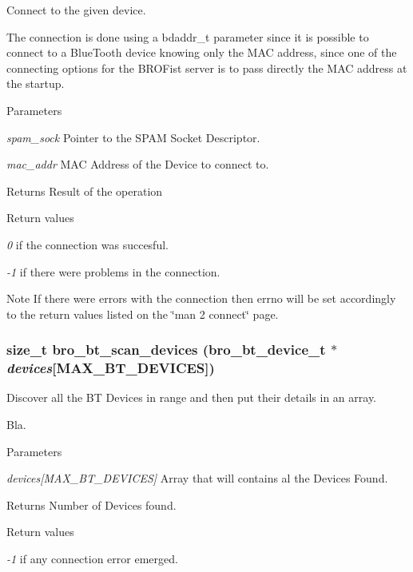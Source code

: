 Connect to the given device. 

The connection is done using a {\ttfamily bdaddr\_\-t} parameter since it is possible to connect to a BlueTooth device knowing only the MAC address, since one of the connecting options for the BROFist server is to pass directly the MAC address at the startup.


\begin{DoxyParams}{Parameters}
\item[{\em spam\_\-sock}]Pointer to the SPAM Socket Descriptor. \item[{\em mac\_\-addr}]MAC Address of the Device to connect to. \end{DoxyParams}
\begin{DoxyReturn}{Returns}
Result of the operation 
\end{DoxyReturn}

\begin{DoxyRetVals}{Return values}
\item[{\em 0}]if the connection was succesful. \item[{\em -\/1}]if there were problems in the connection. \end{DoxyRetVals}
\begin{DoxyNote}{Note}
If there were errors with the connection then {\ttfamily errno} will be set accordingly to the return values listed on the {\ttfamily \char`\"{}man 2
        connect\char`\"{}} page. 
\end{DoxyNote}
\hypertarget{group___bro_b_t_ga4d15ac149696de8a2e530da1840cd8c3}{
\subsubsection[{bro\_\-bt\_\-scan\_\-devices}]{\setlength{\rightskip}{0pt plus 5cm}size\_\-t bro\_\-bt\_\-scan\_\-devices ({\bf bro\_\-bt\_\-device\_\-t} $\ast$ {\em devices}\mbox{[}MAX\_\-BT\_\-DEVICES\mbox{]})}}
\label{group___bro_b_t_ga4d15ac149696de8a2e530da1840cd8c3}


Discover all the BT Devices in range and then put their details in an array. 

Bla.


\begin{DoxyParams}{Parameters}
\item[{\em devices\mbox{[}MAX\_\-BT\_\-DEVICES\mbox{]}}]Array that will contains al the Devices Found. \end{DoxyParams}
\begin{DoxyReturn}{Returns}
Number of Devices found. 
\end{DoxyReturn}

\begin{DoxyRetVals}{Return values}
\item[{\em -\/1}]if any connection error emerged. \end{DoxyRetVals}
